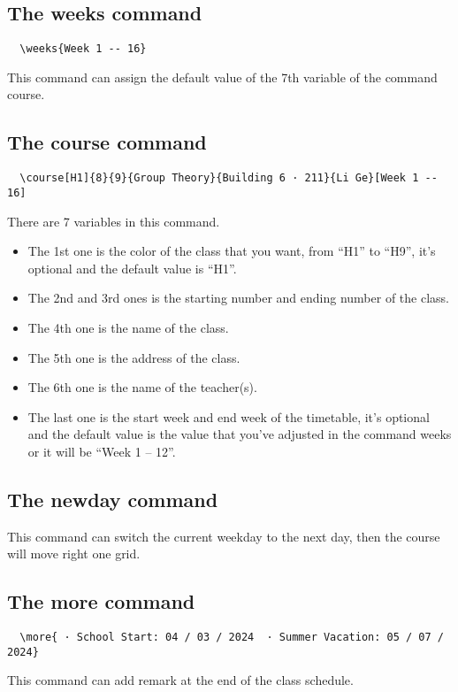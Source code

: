 \documentclass[11pt]{article}
\def\cmd#1{\texorpdfstring{\textcolor{cmdcolor}{\textsf{#1}}}{“#1”}}
\begin{document}
\subsection{The \cmd{weeks} command}
\begin{verbatim}
  \weeks{Week 1 -- 16}
\end{verbatim}

This command can assign the default value of the 7th variable of the command \cmd{course}.

\subsection{The \cmd{course} command}
\begin{verbatim}
  \course[H1]{8}{9}{Group Theory}{Building 6 · 211}{Li Ge}[Week 1 -- 16]
\end{verbatim}

There are 7 variables in this command.
\begin{itemize}
  \item The 1st one is the color of the class that you want, from ``H1'' to ``H9'', it's optional and the default value is ``H1''.
  \item The 2nd and 3rd ones is the starting number and ending number of the class.
  \item The 4th one is the name of the class.
  \item The 5th one is the address of the class.
  \item The 6th one is the name of the teacher(s).
  \item The last one is the start week and end week of the timetable, it's optional and the default value is the value that you've adjusted in the command \cmd{weeks} or it will be ``Week 1 -- 12''.
\end{itemize}

\subsection{The \cmd{newday} command}
This command can switch the current weekday to the next day, then the course will move right one grid.

\subsection{The \cmd{more} command}
\begin{verbatim}
  \more{ · School Start: 04 / 03 / 2024  · Summer Vacation: 05 / 07 / 2024}
\end{verbatim}
This command can add remark at the end of the class schedule.
\end{document}

